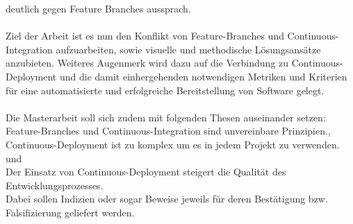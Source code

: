 \documentclass[11pt,english,german]{article}
\begin{document}
deutlich gegen \glqq Feature Branches\grqq{} aussprach.
\\
\\
Ziel der Arbeit ist es nun den Konflikt von \glqq Feature-Branches\grqq{}  und \glqq Continuous-Integration\grqq{}
aufzuarbeiten, sowie visuelle und methodische Lösungsansätze anzubieten.
Weiteres Augenmerk wird dazu auf die Verbindung zu \glqq Continuous-Deployment\grqq{}  und die damit einhergehenden
notwendigen Metriken und Kriterien für eine automatisierte und erfolgreiche Bereitstellung von Software gelegt.
\\
\\
Die Masterarbeit soll sich zudem mit folgenden Thesen auseinander setzen: \\
\glqq Feature-Branches und Continuous-Integration sind unvereinbare Prinzipien.\grqq{},\\
\glqq Continuous-Deployment ist zu komplex um es in jedem Projekt zu verwenden.\grqq{} und\\
\glqq Der Einsatz von Continuous-Deployment steigert die Qualität des Entwicklungsprozesses.\grqq{}\\
Dabei sollen Indizien oder sogar Beweise jeweils für deren Bestätigung bzw. Falsifizierung geliefert werden.
\end{document}
